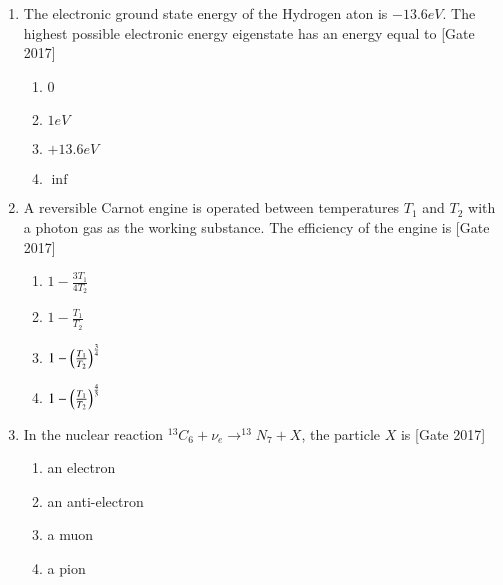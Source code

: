 \documentclass[journal]{IEEEtran}
\begin{document}
\begin{enumerate}
\begin{multicols}{4}
\begin{enumerate}
		\item 8
		\item 10
	\end{enumerate}
\end{multicols}
	\item The electronic ground state energy of the Hydrogen aton is $-13.6eV$. The highest possible electronic energy eigenstate has an energy equal to \hfill{[Gate 2017]}
	\begin{multicols}{4}
	\begin{enumerate}
		\item 0
		\item $1eV$
		\item $+13.6eV$
		\item $\inf$
	\end{enumerate}
\end{multicols}
	\item A reversible Carnot engine is operated between temperatures $T_1$ and $T_2$  with a photon gas as the working substance. The efficiency of the engine is \hfill{[Gate 2017]}
	\begin{multicols}{4}
	\begin{enumerate}
		\item $1-\frac{3T_1}{4T_2}$
		\item $1-\frac{T_1}{T_2}$
		\item $1-\left(\frac{T_1}{T_2}\right)^{\frac{3}{4}}$
		\item $1-\left(\frac{T_1}{T_2}\right)^{\frac{4}{3}}$
	\end{enumerate}
\end{multicols}
	\item In the nuclear reaction $^{13}C_6 + \nu _e \rightarrow ^{13}N_7 + X$, the particle $X$ is \hfill{[Gate 2017]}
\begin{multicols}{4}
	\begin{enumerate}
		\item an electron
		\item an anti-electron
		\item a muon
		\item a pion
	\end{enumerate}
\end{multicols}	


\end{enumerate}
\end{document}

